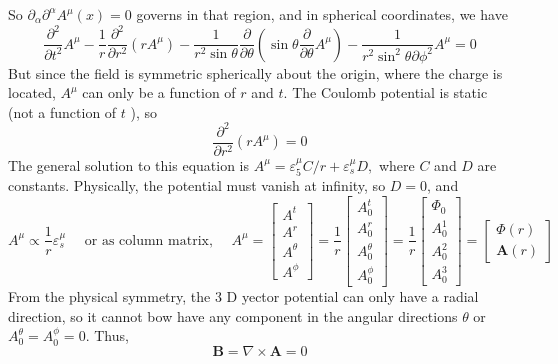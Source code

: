 So $\partial_{\alpha} \partial^{\alpha} A^{\mu}(x)=0$ governs in that region, and in spherical coordinates, we have
\begin{equation}\frac{\partial^{2}}{\partial t^{2}} A^{\mu}-\frac{1}{r} \frac{\partial^{2}}{\partial r^{2}}\left(r A^{\mu}\right)-\frac{1}{r^{2} \sin \theta} \frac{\partial}{\partial \theta}\left(\sin \theta \frac{\partial}{\partial \theta} A^{\mu}\right)-\frac{1}{r^{2} \sin ^{2} \theta \partial \phi^{2}} A^{\mu}=0\end{equation}
But since the field is symmetric spherically about the origin, where the charge is located, $A^{\mu}$ can only be a function of $r$ and $t .$ The Coulomb potential is static (not a function of $t$ ), so
\begin{equation}\frac{\partial^{2}}{\partial r^{2}}\left(r A^{\mu}\right)=0
\end{equation}
The general solution to this equation is $A^{\mu}=\varepsilon_{5}^{\mu} C / r+\varepsilon_{s}^{\mu} D,$ where $C$ and $D$ are constants. Physically, the potential must vanish at infinity, so $D=0$, and
\begin{equation}A^{\mu} \propto \frac{1}{r} \varepsilon_{s}^{\mu} \quad \text { or as column matrix, } \quad A^{\mu}=\left[\begin{array}{c}
A^{t} \\
A^{r} \\
A^{\theta} \\
A^{\phi}
\end{array}\right]=\frac{1}{r}\left[\begin{array}{c}
A_{0}^{t} \\
A_{0}^{r} \\
A_{0}^{\theta} \\
A_{0}^{\phi}
\end{array}\right]=\frac{1}{r}\left[\begin{array}{c}
\Phi_{0} \\
A_{0}^{1} \\
A_{0}^{2} \\
A_{0}^{3}
\end{array}\right]=\left[\begin{array}{c}
\Phi(r) \\
\mathbf{A}(r)
\end{array}\right]\end{equation}
From the physical symmetry, the 3 D yector potential can only have a radial direction, so it cannot bow have any component in the angular directions $\theta$ or $A_{0}^{\theta}=A_{0}^{\phi}=0 .$ Thus,
\begin{equation}
\mathbf{B}=\nabla \times \mathbf{A}=0
\end{equation}
